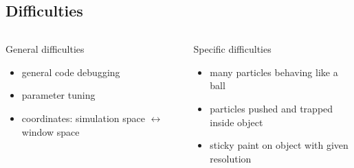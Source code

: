 \subsection{Difficulties}
\begin{frame}
	\begin{columns}[t]
		\begin{column}{0.5\textwidth}
			\begin{block}{General difficulties}
				\begin{itemize}
					\item general code debugging
					\item parameter tuning
					\item coordinates: simulation space $\leftrightarrow$ window space
				\end{itemize}
			\end{block}
		\end{column}
		\pause
		\begin{column}{0.5\textwidth}
			\begin{block}{Specific difficulties}
				\begin{itemize}
					\item many particles behaving like a ball
					\item particles pushed and trapped inside object
					\item sticky paint on object with given resolution
				\end{itemize}
			\end{block}
		\end{column}
	\end{columns}
\end{frame}
